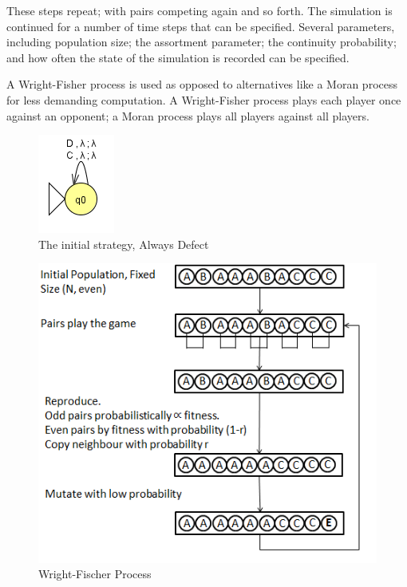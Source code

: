 \documentclass[a4paper,11pt,bcshonoursthesis,singlespace,oneside,thesisdraft,pdflatex]{cssethesis}
\begin{document}
These steps repeat; with pairs competing again and so forth. 
The simulation is continued for a number of time steps that can be specified. 
Several parameters, including population size; the assortment parameter; the continuity probability; and how often the state of the simulation is recorded can be specified. 

A Wright-Fisher process is used as opposed to alternatives like a Moran process \citep{moran1962statistical} for less demanding computation. A Wright-Fisher process plays each player once against an opponent; a Moran process plays all players against all players. 

\begin{figure}[h]
\centering
\includegraphics{alwaysDefect}
\caption{The initial strategy, Always Defect}
\label{fig:alld}
\end{figure}
\begin{figure}[h]
\centering
\includegraphics{wrightfischer}
\caption{Wright-Fischer Process}
\label{fig:wright}
\end{figure}
\pagebreak
\end{document}
